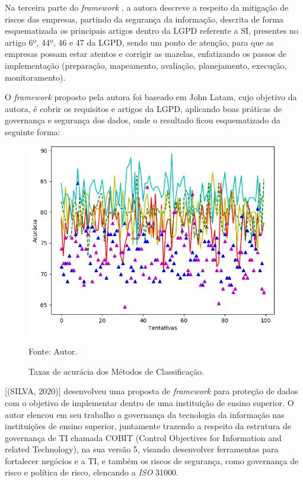 \documentclass[
	12pt,				%
	openright,			%
	oneside,			%
	a4paper,			%
	english,			%
	french,				%
	spanish,			%
	brazil,				%
	]{abntex2}
\begin{document}
Na terceira parte do \textit{framework} , a autora descreve a respeito da mitigação de riscos das empresas, partindo da segurança da informação, descrita de forma esquematizada os principais artigos dentro da LGPD referente a SI, presentes no artigo 6º, 44º, 46 e 47 da LGPD, sendo um ponto de atenção, para que as empresas possam estar atentos e corrigir as mazelas, enfatizando os passos de implementação (preparação, mapeamento, avaliação, planejamento, execução, monitoramento).

O \textit{framework}  proposto pela autora foi baseado em John Latam, cujo objetivo da autora, é cobrir os requisitos e artigos da LGPD, aplicando boas práticas de governança e segurança dos dados, onde o resultado ficou esquematizado da seguinte forma:

\begin{figure}[ht]
    \centering
    \caption{Taxas de acurácia dos Métodos de Classificação.}
    \includegraphics[width=5.0in]{Images/acc-classification.png}
    \label{fig: grafico-acc}
    
    \centering \small Fonte: Autor.
\end{figure}

[(SILVA, 2020)] desenvolveu uma proposta de \textit{framework}  para proteção de dados com o objetivo de implementar dentro de uma instituição de ensino superior. O autor elencou em seu trabalho a governança da tecnologia da informação nas instituições de ensino superior, juntamente trazendo a respeito da estrutura de governança de TI chamada COBIT (Control Objectives for Information and related Technology), na sua versão 5, visando desenvolver ferramentas para fortalecer negócios e a TI, e também os riscos de segurança, como governança de risco e política de risco, elencando a \textit{ISO} 31000.
\end{document}
